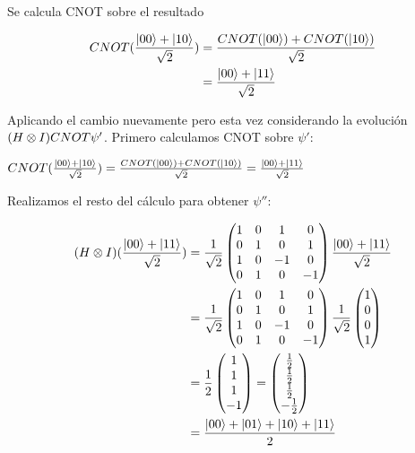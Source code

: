 \documentclass[osajnl,preprint,showpacs,superscriptaddress,10pt]{revtex4-1} %
\DeclarePairedDelimiter\ket{\lvert}{\rangle}
\begin{document}
Se calcula CNOT sobre el resultado
\begin{fleqn}[\parindent]
\begin{equation}
\begin{split}
    CNOT(\frac{\ket{00} + \ket{10}}{\sqrt{2}})
        &= \frac{CNOT(\ket{00}) + CNOT(\ket{10})}{\sqrt{2}} \\
        &= \frac{\ket{00} + \ket{11}}{\sqrt{2}}
\end{split}
\end{equation}
\end{fleqn}

Aplicando el cambio nuevamente pero esta vez considerando la evolución  $(H \tens I) CNOT \psi'$. Primero calculamos CNOT sobre $\psi'$:

$CNOT(\frac{\ket{00} + \ket{10}}{\sqrt{2}}) = \frac{CNOT(\ket{00}) + CNOT(\ket{10})}{\sqrt{2}} = \frac{\ket{00} + \ket{11}}{\sqrt{2}}$

Realizamos el resto del cálculo para obtener $\psi''$:

\begin{fleqn}[\parindent]
\begin{equation}
\begin{split}
    (H \tens I)(\frac{\ket{00} + \ket{11}}{\sqrt{2}})
        &= \frac{1}{\sqrt{2}}
            \begin{pmatrix}
                1 & 0 & 1 & 0 \\
                0 & 1 & 0 & 1 \\
                1 & 0 & -1 & 0 \\
                0 & 1 & 0 & -1 
            \end{pmatrix} \frac{\ket{00} + \ket{11}}{\sqrt{2}} \\
        &= \frac{1}{\sqrt{2}}
            \begin{pmatrix}
                1 & 0 & 1 & 0 \\
                0 & 1 & 0 & 1 \\
                1 & 0 & -1 & 0 \\
                0 & 1 & 0 & -1 
            \end{pmatrix} \frac{1}{\sqrt{2}} \begin{pmatrix} 1 \\ 0 \\ 0 \\ 1 \end{pmatrix} \\
        &= \frac{1}{2} \begin{pmatrix} 1 \\ 1 \\ 1 \\ -1 \end{pmatrix} = \begin{pmatrix} \frac{1}{2} \\ \frac{1}{2} \\ \frac{1}{2} \\ -\frac{1}{2} \end{pmatrix} \\
        &= \frac{\ket{00} + \ket{01} + \ket{10} + \ket{11}}{2}
\end{split}
\end{equation}
\end{fleqn}
\end{document}
